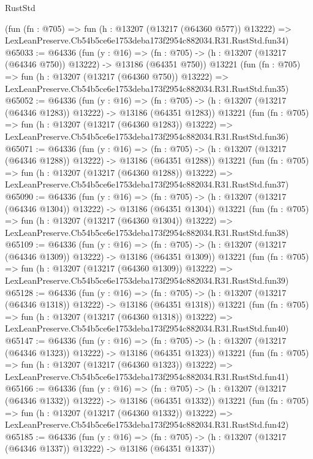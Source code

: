 \begin{lexlean}{RustStd}
\begin{coremodule}
    (fun (fn : @705) =>
    fun (h : @13207 (@13217 (@64360 @577)) @13222) =>
    LexLeanPreserve.Cb54b5ce6e1753deba173f2954c882034.R31.RustStd.fun34)
@65033 := @64336
    (fun (y : @16) =>
    (fn : @705) -> (h : @13207 (@13217 (@64346 @750)) @13222) -> @13186 (@64351 @750))
    @13221
    (fun (fn : @705) =>
    fun (h : @13207 (@13217 (@64360 @750)) @13222) =>
    LexLeanPreserve.Cb54b5ce6e1753deba173f2954c882034.R31.RustStd.fun35)
@65052 := @64336
    (fun (y : @16) =>
    (fn : @705) -> (h : @13207 (@13217 (@64346 @1283)) @13222) -> @13186 (@64351 @1283))
    @13221
    (fun (fn : @705) =>
    fun (h : @13207 (@13217 (@64360 @1283)) @13222) =>
    LexLeanPreserve.Cb54b5ce6e1753deba173f2954c882034.R31.RustStd.fun36)
@65071 := @64336
    (fun (y : @16) =>
    (fn : @705) -> (h : @13207 (@13217 (@64346 @1288)) @13222) -> @13186 (@64351 @1288))
    @13221
    (fun (fn : @705) =>
    fun (h : @13207 (@13217 (@64360 @1288)) @13222) =>
    LexLeanPreserve.Cb54b5ce6e1753deba173f2954c882034.R31.RustStd.fun37)
@65090 := @64336
    (fun (y : @16) =>
    (fn : @705) -> (h : @13207 (@13217 (@64346 @1304)) @13222) -> @13186 (@64351 @1304))
    @13221
    (fun (fn : @705) =>
    fun (h : @13207 (@13217 (@64360 @1304)) @13222) =>
    LexLeanPreserve.Cb54b5ce6e1753deba173f2954c882034.R31.RustStd.fun38)
@65109 := @64336
    (fun (y : @16) =>
    (fn : @705) -> (h : @13207 (@13217 (@64346 @1309)) @13222) -> @13186 (@64351 @1309))
    @13221
    (fun (fn : @705) =>
    fun (h : @13207 (@13217 (@64360 @1309)) @13222) =>
    LexLeanPreserve.Cb54b5ce6e1753deba173f2954c882034.R31.RustStd.fun39)
@65128 := @64336
    (fun (y : @16) =>
    (fn : @705) -> (h : @13207 (@13217 (@64346 @1318)) @13222) -> @13186 (@64351 @1318))
    @13221
    (fun (fn : @705) =>
    fun (h : @13207 (@13217 (@64360 @1318)) @13222) =>
    LexLeanPreserve.Cb54b5ce6e1753deba173f2954c882034.R31.RustStd.fun40)
@65147 := @64336
    (fun (y : @16) =>
    (fn : @705) -> (h : @13207 (@13217 (@64346 @1323)) @13222) -> @13186 (@64351 @1323))
    @13221
    (fun (fn : @705) =>
    fun (h : @13207 (@13217 (@64360 @1323)) @13222) =>
    LexLeanPreserve.Cb54b5ce6e1753deba173f2954c882034.R31.RustStd.fun41)
@65166 := @64336
    (fun (y : @16) =>
    (fn : @705) -> (h : @13207 (@13217 (@64346 @1332)) @13222) -> @13186 (@64351 @1332))
    @13221
    (fun (fn : @705) =>
    fun (h : @13207 (@13217 (@64360 @1332)) @13222) =>
    LexLeanPreserve.Cb54b5ce6e1753deba173f2954c882034.R31.RustStd.fun42)
@65185 := @64336
    (fun (y : @16) =>
    (fn : @705) -> (h : @13207 (@13217 (@64346 @1337)) @13222) -> @13186 (@64351 @1337))

\end{coremodule}
\end{lexlean}
